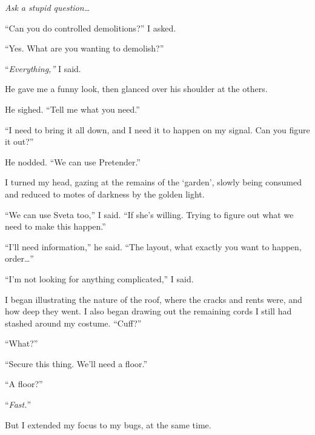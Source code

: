 \emph{Ask a stupid question\ldots}



``Can you do controlled demolitions?'' I asked.



``Yes.  What are you wanting to demolish?''



``\emph{Everything,'' }I said.



He gave me a funny look, then glanced over his shoulder at the others.



He sighed.  ``Tell me what you need.''



``I need to bring it all down, and I need it to happen on my signal.  Can you figure it out?''



He nodded.  ``We can use Pretender.''



I turned my head, gazing at the remains of the `garden', slowly being consumed and reduced to motes of darkness by the golden light.



``We can use Sveta too,'' I said.  ``If she's willing.  Trying to figure out what we need to make this happen.''



``I'll need information,'' he said.  ``The layout, what exactly you want to happen, order\ldots''



``I'm not looking for anything complicated,'' I said.



I began illustrating the nature of the roof, where the cracks and rents were, and how deep they went.  I also began drawing out the remaining cords I still had stashed around my costume.  ``Cuff?''



``What?''



``Secure this thing.  We'll need a floor.''



``A floor?''



``\emph{Fast.}''



But I extended my focus to my bugs, at the same time.



